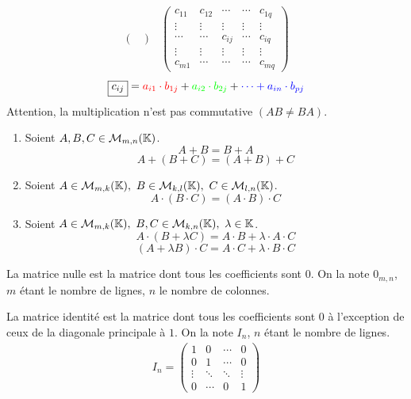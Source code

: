 \begin{definition}
\begin{enumerate}
\begin{align*}
\begin{pmatrix}
            \end{pmatrix}
            &\begin{pmatrix}
                c_{11} & c_{12} & \cdots & \cdots & c_{1q} \\
                \vdots & \vdots & \vdots & \vdots & \vdots \\
                \cdots & \cdots & \boxed{c_{ij}} & \cdots & c_{iq} \\
                \vdots & \vdots & \vdots & \vdots & \vdots \\
                c_{m1} & \cdots & \cdots & \cdots & c_{mq}
            \end{pmatrix}
        \end{align*}
        \[ \boxed{c_{ij}} = \color{red}a_{i1} \cdot b_{1j} \color{black}+ \color{green} a_{i2} \cdot b_{2j} \color{black}+ \color{blue}\cdots + a_{in} \cdot b_{pj} \]
		Attention, la multiplication n'est pas commutative $(AB \neq BA)$.
	\end{enumerate}
\end{definition}

\begin{proposition}\leavevmode
	\begin{enumerate}
		\item Soient $A, B, C \in \mathcal{M}_{m,n} (\mathbb{K})$.
		\[A + B = B + A\]
		\[A + (B + C) = (A + B) + C\]
		\item Soient $A \in \mathcal{M}_{m, k}(\K),\ B \in \mathcal{M}_{k, l}(\K),\ C \in \mathcal{M}_{l, n}(\K)$.
		\[A \cdot (B \cdot C) = (A \cdot B) \cdot C\]
		\item Soient $A \in \mathcal{M}_{m, k}(\K),\ B, C \in \mathcal{M}_{k, n}(\K),\ \lambda \in \K$.
		\[A \cdot (B + \lambda C) = A \cdot B + \lambda \cdot A \cdot C\]
		\[(A + \lambda B) \cdot C = A \cdot C + \lambda \cdot B \cdot C\]
	\end{enumerate}
\end{proposition}

\begin{definition}
	La matrice nulle est la matrice dont tous les coefficients sont $0$. On la note $0_{m,n}$, $m$ étant le nombre de lignes, $n$ le nombre de colonnes. 
\end{definition}

\begin{definition}
	La matrice identité est la matrice dont tous les coefficients sont $0$ à l'exception de ceux de la diagonale principale à $1$. On la note $I_n$, $n$ étant le nombre de lignes.
	\begin{align*}
		I_n = 
		\begin{pmatrix}
			1 & 0 & \cdots & 0 \\
			0 & 1 & \cdots & 0 \\
			\vdots & \ddots & \ddots & \vdots \\
			0 & \cdots & 0 & 1
		\end{pmatrix}
	\end{align*}
\end{definition}

